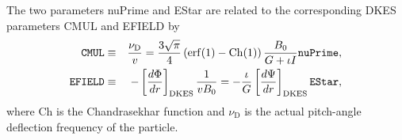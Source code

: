 The two parameters {\ttfamily nuPrime} and {\ttfamily EStar} are
related to the corresponding DKES parameters {\ttfamily CMUL} and
{\ttfamily EFIELD} by
\begin{eqnarray}
  \mbox{\ttfamily
    CMUL}&\equiv&\frac{\nu_\mathrm{D}}{v}=\frac{3\sqrt{\pi}}{4}\left(\mathrm{erf}(1)-\mathrm{Ch}(1)\right)
  \frac{B_0}{G+\iota I}\mbox{\ttfamily nuPrime},\\
  \mbox{\ttfamily EFIELD}&\equiv&-\left[\frac{d\Phi}{dr}\right]_\mathrm{DKES}\frac{1}{vB_0}=-\frac{\iota}{G}\left[\frac{d\Psi}{dr}\right]_\mathrm{DKES}\mbox{\ttfamily EStar},
\end{eqnarray}
where $\mathrm{Ch}$ is the Chandrasekhar function and $\nu_\mathrm{D}$
is the actual pitch-angle deflection frequency of the particle.

